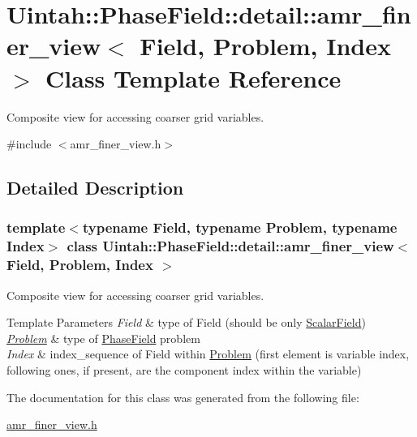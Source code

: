 \hypertarget{classUintah_1_1PhaseField_1_1detail_1_1amr__finer__view}{}\section{Uintah\+:\+:Phase\+Field\+:\+:detail\+:\+:amr\+\_\+finer\+\_\+view$<$ Field, Problem, Index $>$ Class Template Reference}
\label{classUintah_1_1PhaseField_1_1detail_1_1amr__finer__view}


Composite view for accessing coarser grid variables.  




{\ttfamily \#include $<$amr\+\_\+finer\+\_\+view.\+h$>$}



\subsection{Detailed Description}
\subsubsection*{template$<$typename Field, typename Problem, typename Index$>$\newline
class Uintah\+::\+Phase\+Field\+::detail\+::amr\+\_\+finer\+\_\+view$<$ Field, Problem, Index $>$}

Composite view for accessing coarser grid variables. 


\begin{DoxyTemplParams}{Template Parameters}
{\em Field} & type of Field (should be only \hyperlink{structUintah_1_1PhaseField_1_1ScalarField}{Scalar\+Field}) \\
\hline
{\em \hyperlink{classUintah_1_1PhaseField_1_1Problem}{Problem}} & type of \hyperlink{namespaceUintah_1_1PhaseField}{Phase\+Field} problem \\
\hline
{\em Index} & index\+\_\+sequence of Field within \hyperlink{classUintah_1_1PhaseField_1_1Problem}{Problem} (first element is variable index, following ones, if present, are the component index within the variable) \\
\hline
\end{DoxyTemplParams}


The documentation for this class was generated from the following file\+:\begin{DoxyCompactItemize}
\item 
\hyperlink{amr__finer__view_8h}{amr\+\_\+finer\+\_\+view.\+h}\end{DoxyCompactItemize}
